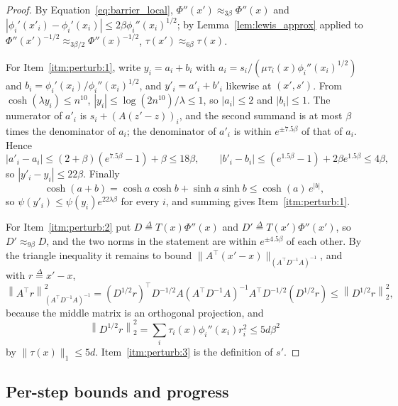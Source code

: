 \documentclass[11pt]{article}
\newcommand{\defeq}{\stackrel{\Delta}{=}}
\begin{document}
\begin{proof}
By Equation~\eqref{eq:barrier_local}, $\Phi''(x') \approx_{3 \beta} \Phi''(x)$
and $|\phi_i'(x'_i) - \phi_i'(x_i)| \le 2 \beta \phi_i''(x_i)^{1/2}$; by
Lemma~\ref{lem:lewis_approx} applied to
$\Phi''(x')^{-1/2} \approx_{3 \beta / 2} \Phi''(x)^{-1/2}$,
$\tau(x') \approx_{6 \beta} \tau(x)$.

For Item~\ref{itm:perturb:1}, write $y_i = a_i + b_i$ with
$a_i = s_i / (\mu \tau_i(x) \phi_i''(x_i)^{1/2})$ and
$b_i = \phi_i'(x_i) / \phi_i''(x_i)^{1/2}$, and
$y'_i = a'_i + b'_i$ likewise at
$(x', s')$.
From $\cosh(\lambda y_i) \le n^{10}$,
$|y_i| \le \log(2 n^{10}) / \lambda \le 1$, so
$|a_i| \le 2$ and
$|b_i| \le 1$.
The numerator of $a'_i$ is
$s_i + (A (z' - z))_i$, and the second summand is at most
$\beta$ times the denominator of
$a_i$; the denominator of
$a'_i$ is within
$e^{\pm 7.5 \beta}$ of that of
$a_i$.
Hence
\[
|a'_i - a_i|
\le
(2 + \beta) \left( e^{7.5 \beta} - 1 \right) + \beta
\le
18 \beta,
\qquad
|b'_i - b_i|
\le
\left( e^{1.5 \beta} - 1 \right) + 2 \beta e^{1.5 \beta}
\le
4 \beta,
\]
so $|y'_i - y_i| \le 22 \beta$.
Finally
\[
\cosh(a + b)
=
\cosh a \cosh b + \sinh a \sinh b
\le
\cosh(a) \, e^{|b|},
\]
so $\psi(y'_i) \le \psi(y_i) e^{22 \lambda \beta}$ for every
$i$, and summing gives Item~\ref{itm:perturb:1}.

For Item~\ref{itm:perturb:2} put $D \defeq T(x) \Phi''(x)$ and
$D' \defeq T(x') \Phi''(x')$, so
$D' \approx_{9 \beta} D$, and the two norms in the statement are within
$e^{\pm 4.5 \beta}$ of each other.
By the triangle inequality it remains to bound
$\|A^\top (x' - x)\|_{(A^\top D^{-1} A)^{-1}}$, and with
$r \defeq x' - x$,
\[
\left\| A^\top r \right\|_{(A^\top D^{-1} A)^{-1}}^{2}
=
\left( D^{1/2} r \right)^\top
D^{-1/2} A \left( A^\top D^{-1} A \right)^{-1} A^\top D^{-1/2}
\left( D^{1/2} r \right)
\le
\left\| D^{1/2} r \right\|_{2}^{2},
\]
because the middle matrix is an orthogonal projection, and
\[
\left\| D^{1/2} r \right\|_{2}^{2}
=
\sum_i \tau_i(x) \phi_i''(x_i) r_i^{2}
\le
5 d \beta^{2}
\]
by $\|\tau(x)\|_1 \le 5 d$.
Item~\ref{itm:perturb:3} is the definition of $s'$.
\end{proof}

\subsection{Per-step bounds and progress}
\end{document}
